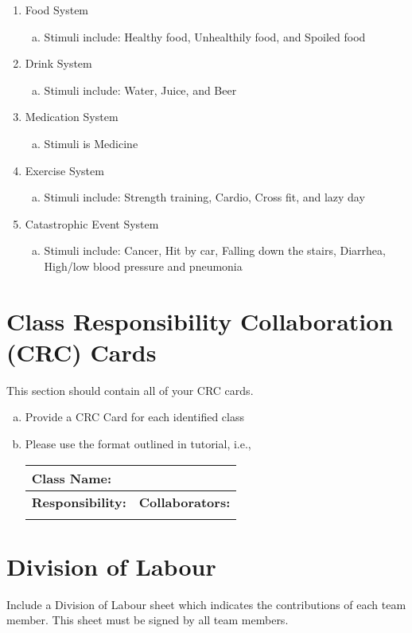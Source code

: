 \documentclass[]{article}
\begin{document}
\begin{enumerate}[1)]
	\item Food System
		\begin{enumerate}[a)]
			\item Stimuli include: Healthy food, Unhealthily food, and Spoiled food
		\end{enumerate}
	\item Drink System
		\begin{enumerate}[a)]
			\item Stimuli include: Water, Juice, and Beer
		\end{enumerate}
	\item Medication System
		\begin{enumerate}[a)]
			\item Stimuli is Medicine
		\end{enumerate}
	\item Exercise System
		\begin{enumerate}[a)]
			\item Stimuli include: Strength training, Cardio, Cross fit, and lazy day
		\end{enumerate}
	\item Catastrophic Event System
		\begin{enumerate}[a)]
			\item Stimuli include: Cancer, Hit by car, Falling down the stairs, Diarrhea, High/low blood pressure and pneumonia
		\end{enumerate}
\end{enumerate}

	
\section{Class Responsibility Collaboration (CRC) Cards}
\label{sec:class_responsibility_collaboration_crc_cards}
This section should contain all of your CRC cards.

\begin{enumerate}[a)]
	\item Provide a CRC Card for each identified class
	\item Please use the format outlined in tutorial, i.e., 
	\begin{table}[ht]
		\centering
		\begin{tabular}{|p{5cm}|p{5cm}|}
		\hline 
		 \multicolumn{2}{|l|}{\textbf{Class Name:}} \\
		\hline
		\textbf{Responsibility:} & \textbf{Collaborators:} \\
		\hline
		\vspace{1in} & \\
		\hline
		\end{tabular}
	\end{table}
	
\end{enumerate}

\appendix
\section{Division of Labour}
\label{sec:division_of_labour}
Include a Division of Labour sheet which indicates the contributions of each team member. This sheet must be signed by all team members.
\end{document}

